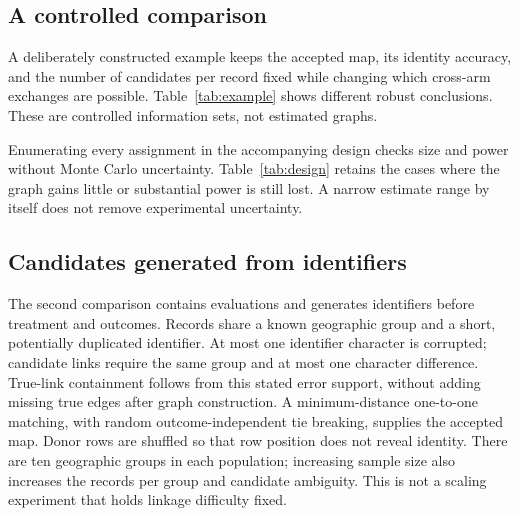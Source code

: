 \documentclass[11pt]{article}
\begin{document}
\subsection{A controlled comparison}
A deliberately constructed example keeps the accepted map, its identity accuracy,
and the number of candidates per record fixed while changing which cross-arm
exchanges are possible. Table~\ref{tab:example} shows different robust conclusions.
These are controlled information sets, not estimated graphs.

Enumerating every assignment in the accompanying design checks size and power without
Monte Carlo uncertainty. Table~\ref{tab:design} retains the cases where the graph gains
little or substantial power is still lost. A narrow estimate range by itself does not
remove experimental uncertainty.


\subsection{Candidates generated from identifiers}
The second comparison contains \IdentifierEvaluations{} evaluations and generates
identifiers before treatment and outcomes. Records
share a known geographic group and a short, potentially duplicated identifier. At most
one identifier character is corrupted; candidate links require the same group and at
most one character difference. True-link containment follows from this stated error
support, without adding missing true edges after graph construction. A minimum-distance
one-to-one matching, with random outcome-independent tie breaking, supplies the accepted map.
Donor rows are shuffled so that row position does not reveal identity. There are
ten geographic groups in each population; increasing sample size also increases
the records per group and candidate ambiguity. This is not a scaling experiment
that holds linkage difficulty fixed.
\end{document}
